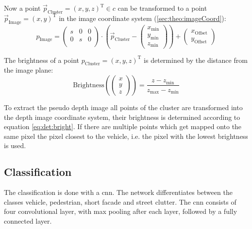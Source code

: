 Now a point $\vec{p}_\text{Cluster} = {(x,y,z)}^\text{T} \in c$ can be transformed to a point $\vec{p}_\text{Image} = {(x,y)}^\text{T}$ in the image coordinate system (\ref{sec:theo:imageCoord}):
\begin{equation} \label{eq:det:trans}
    p_\text{Image} = 
    \begin{pmatrix}
        s & 0 & 0\\
        0 & s & 0\\
    \end{pmatrix} 
    \cdot \left(\vec{p}_\text{Cluster} - 
    \begin{pmatrix} 
        x_\text{min} \\ y_\text{min} \\ z_\text{min} 
    \end{pmatrix} 
    \right) + 
    \begin{pmatrix} 
        x_\text{Offset} \\ y_\text{Offset} 
    \end{pmatrix}
\end{equation}

The brightness of a point $p_\text{Cluster} = {(x,y,z)}^\text{T}$ is determined by the distance from the image plane:
\begin{equation} \label{eq:det:bright}
    \text{Brightness} \left( \begin{pmatrix} x \\ y \\ z \end{pmatrix} \right)  = \frac{z - z_\text{min}}{z_\text{max} - z_\text{min}}
\end{equation}

To extract the pseudo depth image all points of the cluster are transformed into the depth image coordinate system, their brightness is determined according to equation \ref{eq:det:bright}. 
If there are multiple points which get mapped onto the same pixel the pixel closest to the vehicle, i.e. the pixel with the lowest brightness is used.

\subsection{Classification}
The classification is done with a \ac{cnn}. 
The network differentiates between the classes vehicle, pedestrian, short facade and street clutter. 
The \ac{cnn} consists of four convolutional layer, with max pooling after each layer, followed by a fully connected layer.

